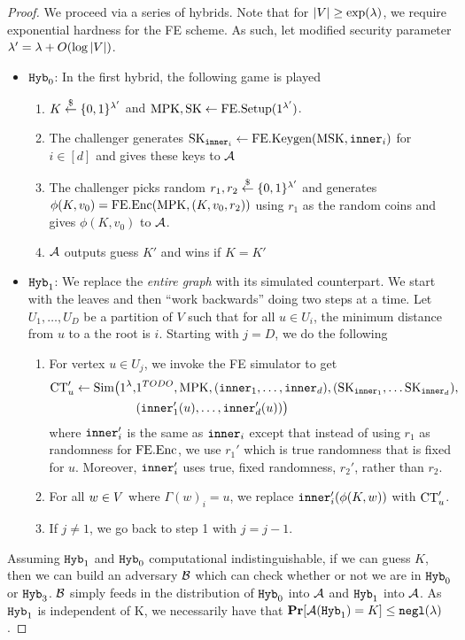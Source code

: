 \begin{lemma}
\begin{proof}
		We proceed via a series of hybrids. Note that for $|V| \geq \exp(\lambda)$, we require exponential hardness for the FE scheme.
		As such, let modified security parameter $\lambda' = \lambda + O(\log |V|)$.
		\begin{itemize}
			\item $\texttt{Hyb}_0$: In the first hybrid, the following game is played
				\begin{enumerate}
					\item $K \overset{\$}{\gets} \{0,1\}^{\lambda'}$ and $\text{MPK}, \text{SK} \gets \text{FE.Setup}(1^{\lambda'})$.
					\item The challenger generates $\text{SK}_{\texttt{inner}_i} \gets \text{FE.Keygen}(\text{MSK}, \texttt{inner}_i)$ for $i \in [d]$ and gives these keys to $\mathcal{A}$
					\item The challenger picks random $r_1, r_2 \overset{\$}{\gets} \{0,1\}^{\lambda'}$ and generates $\phi(K, v_0) = \text{FE.Enc}(\text{MPK}, (K, v_0, r_2))$ using $r_1$ as the random coins and gives $\phi(K, v_0)$ to $\mathcal{A}$.
					\item $\mathcal{A}$ outputs guess $K'$ and wins if $K = K'$
				\end{enumerate}
			\item $\texttt{Hyb}_1$: We replace the \emph{entire graph} with its simulated counterpart.
			We start with the leaves and then ``work backwards'' doing two steps at a time.
			Let $U_1, \dots, U_D$ be a partition of $V$ such that for all $u \in U_i$, the minimum distance from $u$ to a the root is $i$.
			Starting with $j = D$, we do the following
			\begin{enumerate}
				\item For vertex $u \in U_j$, we invoke the FE simulator to get
				\begin{align*}
						\text{CT}_{u}' \gets \text{Sim}\big(1^\lambda, &1^{TODO}, \text{MPK}, (\texttt{inner}_1, \dots, \texttt{inner}_d), (\text{SK}_{\texttt{inner}_1}, \dots \text{SK}_{\texttt{inner}_d}),\\
							&(\texttt{inner}'_1(u), \dots, \texttt{inner}'_d(u))\big)
				\end{align*}
				where $\texttt{inner}'_i$ is the same as $\texttt{inner}_i$ except that instead of using $r_1$ as randomness for $\text{FE.Enc}$, we use $r_1'$ which is true randomness that is fixed for $u$.
				Moreover, $\texttt{inner}'_i$ uses true, fixed randomness, $r_2'$, rather than $r_2$.
				\item For all $w \in V$ where $\Gamma(w)_i = u$, we replace $\texttt{inner}'_i(\phi(K, w))$ with $\text{CT}_{u}'$.
				\label{alg:proof:neighb:replace}
				\item If $j \neq 1$, we go back to step 1 with $j = j - 1$.
			\end{enumerate}
		\end{itemize}
		Assuming $\texttt{Hyb}_1$ and $\texttt{Hyb}_0$ computational indistinguishable, if we can guess $K$, then we can build an adversary $\mathcal{B}$ which can check whether or not we are in $\texttt{Hyb}_0$ or $\texttt{Hyb}_3$. 
		$\mathcal{B}$ simply feeds in the distribution of $\texttt{Hyb}_0$ into $\mathcal{A}$ and $\texttt{Hyb}_1$ into $\mathcal{A}$.
		As $\texttt{Hyb}_1$ is independent of K, we necessarily have that $\operatorname*{\mathbf{Pr}}[\mathcal{A}(\texttt{Hyb}_1) = K] \leq \texttt{negl}(\lambda)$.


\end{proof}
\end{lemma}
